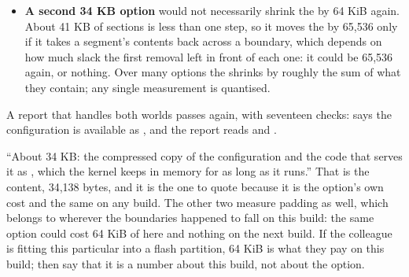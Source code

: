 \begin{itemize}
    mapped with its own permissions using the largest mappings the hardware offers. The
     can therefore only change size in 64 KiB steps, and a step happens when some
    segment's contents cross a boundary.
  \item \textbf{A second 34 KB option} would not necessarily shrink the  by 64 KiB again.
    About 41 KB of sections is less than one step, so it moves the  by 65,536 only if it
    takes a segment's contents back across a boundary, which depends on how much slack the first
    removal left in front of each one: it could be 65,536 again, or nothing. Over many options the
     shrinks by roughly the sum of what they contain; any single measurement is
    quantised.
\end{itemize}

 A report that handles both worlds passes again, with seventeen checks:  says
the configuration is available as , and the report reads  and .

 ``About 34 KB: the compressed copy of the configuration and the code that serves it as
, which the kernel keeps in memory for as long as it runs.'' That is the
content, 34,138 bytes, and it is the one to quote because it is the option's own cost and the same
on any build. The other two measure padding as well, which belongs to wherever the boundaries
happened to fall on this build: the same option could cost 64 KiB of  here and nothing
on the next build. If the colleague is fitting this particular  into a flash partition,
64 KiB is what they pay on this build; then say that it is a number about this build, not about the
option.
